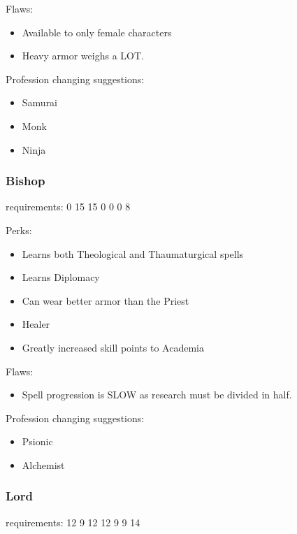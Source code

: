 \documentclass[12pt]{article}
\providecommand{\tightlist}{%
  \setlength{\itemsep}{0pt}\setlength{\parskip}{0pt}}
\begin{document}
Flaws:

\begin{itemize}
\item
  Available to only female characters
\item
  Heavy armor weighs a LOT.
\end{itemize}

Profession changing suggestions:

\begin{itemize}
\item
  Samurai
\item
  Monk
\item
  Ninja
\end{itemize}

\subsubsection{Bishop}\label{bishop}

requirements: 0 15 15 0 0 0 8

Perks:

\begin{itemize}
\item
  Learns both Theological and Thaumaturgical spells
\item
  Learns Diplomacy
\item
  Can wear better armor than the Priest
\item
  Healer
\item
  Greatly increased skill points to Academia
\end{itemize}

Flaws:

\begin{itemize}
\tightlist
\item
  Spell progression is SLOW as research must be divided in half.
\end{itemize}

Profession changing suggestions:

\begin{itemize}
\item
  Psionic
\item
  Alchemist
\end{itemize}

\subsubsection{Lord}\label{lord}

requirements: 12 9 12 12 9 9 14
\end{document}
